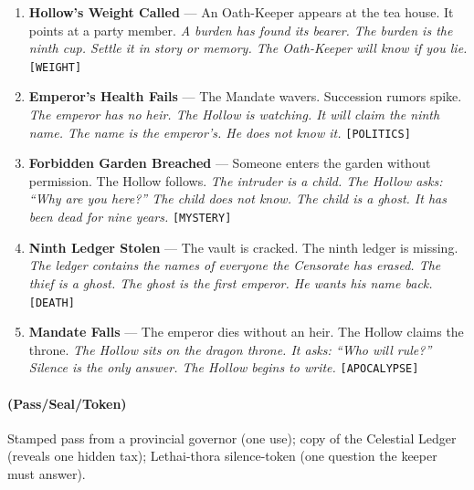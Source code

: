 \begin{enumerate}
\item \textbf{Hollow's Weight Called} --- An Oath-Keeper appears at the tea house. It points at a party member.
  \hfill \textit{A burden has found its bearer. The burden is the ninth cup. Settle it in story or memory. The Oath-Keeper will know if you lie.} \texttt{[WEIGHT]}
\item[\card{\clubsuit}{J}] \textbf{Emperor's Health Fails} --- The Mandate wavers. Succession rumors spike.
  \hfill \textit{The emperor has no heir. The Hollow is watching. It will claim the ninth name. The name is the emperor's. He does not know it.} \texttt{[POLITICS]}
\item[\card{\clubsuit}{Q}] \textbf{Forbidden Garden Breached} --- Someone enters the garden without permission. The Hollow follows.
  \hfill \textit{The intruder is a child. The Hollow asks: ``Why are you here?'' The child does not know. The child is a ghost. It has been dead for nine years.} \texttt{[MYSTERY]}
\item[\card{\clubsuit}{K}] \textbf{Ninth Ledger Stolen} --- The vault is cracked. The ninth ledger is missing.
  \hfill \textit{The ledger contains the names of everyone the Censorate has erased. The thief is a ghost. The ghost is the first emperor. He wants his name back.} \texttt{[DEATH]}
\item[\card{\clubsuit}{A}] \textbf{Mandate Falls} --- The emperor dies without an heir. The Hollow claims the throne.
  \hfill \textit{The Hollow sits on the dragon throne. It asks: ``Who will rule?'' Silence is the only answer. The Hollow begins to write.} \texttt{[APOCALYPSE]}
\end{enumerate}

\paragraph*{(Pass/Seal/Token)} Stamped pass from a provincial governor (one use); copy of the Celestial Ledger (reveals one hidden tax); Lethai-thora silence-token (one question the keeper must answer).

